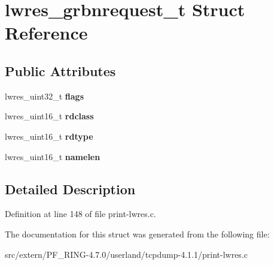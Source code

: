 \hypertarget{structlwres__grbnrequest__t}{
\section{lwres\_\-grbnrequest\_\-t Struct Reference}
\label{structlwres__grbnrequest__t}
}
\subsection*{Public Attributes}
\begin{DoxyCompactItemize}
\item 
\hypertarget{structlwres__grbnrequest__t_a06109379d6d00d10b4b82d8571d048aa}{
lwres\_\-uint32\_\-t {\bfseries flags}}
\label{structlwres__grbnrequest__t_a06109379d6d00d10b4b82d8571d048aa}

\item 
\hypertarget{structlwres__grbnrequest__t_a0024b41abbe68474a60017eda22bc692}{
lwres\_\-uint16\_\-t {\bfseries rdclass}}
\label{structlwres__grbnrequest__t_a0024b41abbe68474a60017eda22bc692}

\item 
\hypertarget{structlwres__grbnrequest__t_a39e15fbe9345f31c4cb4a9a2f326589e}{
lwres\_\-uint16\_\-t {\bfseries rdtype}}
\label{structlwres__grbnrequest__t_a39e15fbe9345f31c4cb4a9a2f326589e}

\item 
\hypertarget{structlwres__grbnrequest__t_a3d87f9af1321a7d4b1c43e8e2cd6da43}{
lwres\_\-uint16\_\-t {\bfseries namelen}}
\label{structlwres__grbnrequest__t_a3d87f9af1321a7d4b1c43e8e2cd6da43}

\end{DoxyCompactItemize}


\subsection{Detailed Description}


Definition at line 148 of file print-\/lwres.c.



The documentation for this struct was generated from the following file:\begin{DoxyCompactItemize}
\item 
src/extern/PF\_\-RING-\/4.7.0/userland/tcpdump-\/4.1.1/print-\/lwres.c\end{DoxyCompactItemize}
